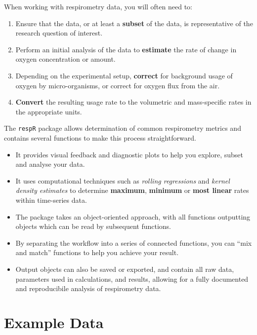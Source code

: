 \documentclass[]{book}
\providecommand{\tightlist}{%
  \setlength{\itemsep}{0pt}\setlength{\parskip}{0pt}}
\begin{document}
When working with respirometry data, you will often need to:

\begin{enumerate}
\def\labelenumi{\arabic{enumi}.}
\tightlist
\item
  Ensure that the data, or at least a \textbf{subset} of the data, is
  representative of the research question of interest.
\item
  Perform an initial analysis of the data to \textbf{estimate} the rate
  of change in oxygen concentration or amount.
\item
  Depending on the experimental setup, \textbf{correct} for background
  usage of oxygen by micro-organisms, or correct for oxygen flux from
  the air.
\item
  \textbf{Convert} the resulting usage rate to the volumetric and
  mass-specific rates in the appropriate units.
\end{enumerate}

The \texttt{respR} package allows determination of common respirometry
metrics and contains several functions to make this process
straightforward.

\begin{itemize}
\tightlist
\item
  It provides visual feedback and diagnostic plots to help you explore,
  subset and analyse your data.
\item
  It uses computational techniques such as \emph{rolling regressions}
  and \emph{kernel density estimates} to determine \textbf{maximum},
  \textbf{minimum} or \textbf{most linear} rates within time-series
  data.
\item
  The package takes an object-oriented approach, with all functions
  outputting objects which can be read by subsequent functions.
\item
  By separating the workflow into a series of connected functions, you
  can ``mix and match'' functions to help you achieve your result.
\item
  Output objects can also be saved or exported, and contain all raw
  data, parameters used in calculations, and results, allowing for a
  fully documented and reproducibile analysis of respirometry data.
\end{itemize}

\section{Example Data}\label{example-data}
\end{document}
